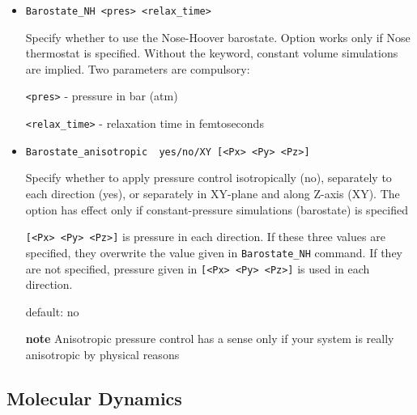 \documentclass{article}
\begin{document}
\begin{itemize}
Default:  yes 0 

\item
\verb|Barostate_NH <pres> <relax_time>|

Specify whether to use the Nose-Hoover barostate. Option works only if
Nose thermostat is specified. Without the keyword, constant volume
simulations are implied. Two parameters are compulsory:

\verb|<pres>| - pressure in bar (atm)

\verb|<relax_time>| - relaxation time in femtoseconds 

\item
\verb|Barostate_anisotropic  yes/no/XY [<Px> <Py> <Pz>]|

Specify whether to apply pressure control isotropically (no),
separately to each direction (yes), or separately in XY-plane and 
along Z-axis (XY). The option has effect only
if constant-pressure simulations (barostate) is specified

\verb|[<Px> <Py> <Pz>]| is pressure in each direction. If these 
three values are specified, they overwrite the value given in 
\verb|Barostate_NH| command. If they are not specified, pressure 
given in \verb|[<Px> <Py> <Pz>]| is used in each direction.

default: no

{\bf note}  Anisotropic pressure control has a sense only if your system 
is really anisotropic by physical reasons 

\end{itemize}

\subsection{Molecular Dynamics}
\end{document}
